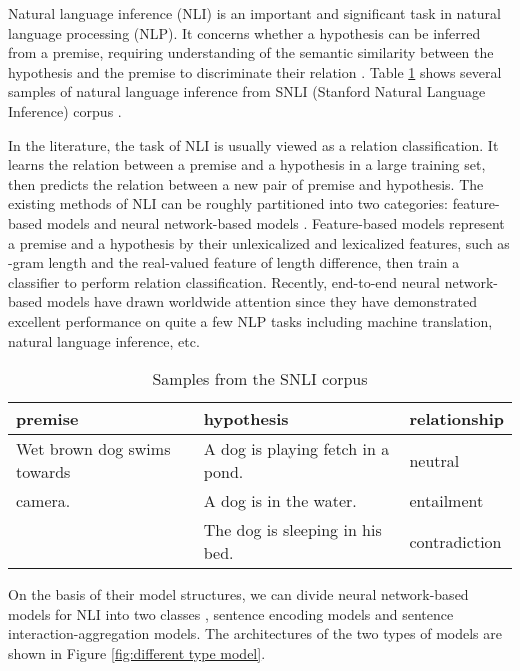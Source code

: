 \documentclass[10pt,sigconf]{acmart}
\begin{document}
Natural language inference (NLI) is an important and significant task in natural language processing (NLP). It concerns whether a hypothesis can be inferred from a premise, requiring understanding of the semantic similarity between the hypothesis and the premise to discriminate their relation \cite{lan2018toolkit}. Table \ref{tab:samples} shows several samples of natural language inference from SNLI (Stanford Natural Language Inference) corpus \cite{bowman2015large}.

 In the literature, the task of NLI is usually viewed as a relation classification. It learns the relation between a premise and a hypothesis in a large training set, then predicts the relation between a new pair of premise and hypothesis. The existing methods of NLI can be roughly partitioned into two categories: feature-based models \cite{bowman2015large} and neural network-based models \cite{yang2016hierarchical,chen2016enhanced}. Feature-based models represent a premise and a hypothesis by their unlexicalized and lexicalized features, such as -gram length and the real-valued feature of length difference, then train a classifier to perform relation classification. Recently, end-to-end neural network-based models have drawn worldwide attention since they have demonstrated excellent performance on quite a few NLP tasks including machine translation, natural language inference, etc.

 \begin{table}[h]
\begin{tabular}{|p{2.5cm}|p{3cm}|l|}
\hline
premise                     & hypothesis                        & relationship  \\ \hline
Wet brown dog swims towards & A dog is playing fetch in a pond. & neutral       \\ \cline{2-3}
camera.                     & A dog is in the water.            & entailment    \\ \cline{2-3}
                            & The dog is sleeping in his bed.   & contradiction \\ \hline
\end{tabular}
 \caption{Samples from the SNLI corpus}
 \label{tab:samples}
\end{table}

 On the basis of their model structures, we can divide neural network-based models for NLI into two classes \cite{lan2018toolkit}, sentence encoding models and sentence interaction-aggregation models. The architectures of the two types of models are shown in Figure \ref{fig:different type model}.
\end{document}
